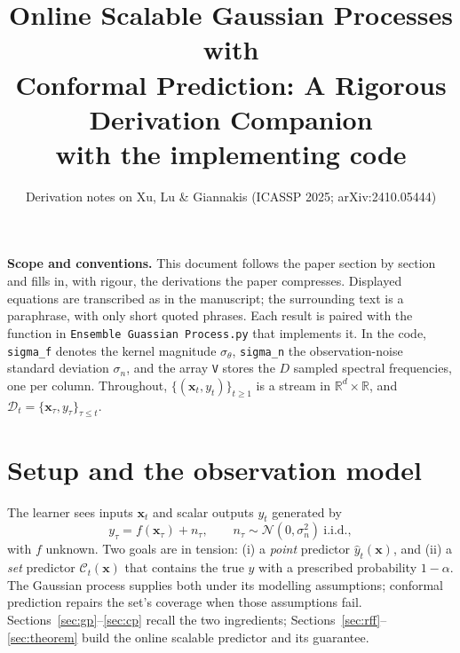 \documentclass[11pt]{article}
\title{\vspace{-1.2cm}\bfseries Online Scalable Gaussian Processes with\\Conformal Prediction: A Rigorous Derivation Companion\\[2pt]\large with the implementing code}
\author{Derivation notes on Xu, Lu \& Giannakis (ICASSP 2025; arXiv:2410.05444)}
\date{}
\theoremstyle{plain}
\theoremstyle{definition}
\newcommand{\R}{\mathbb{R}}
\newcommand{\N}{\mathcal{N}}
\newcommand{\D}{\mathcal{D}}
\newcommand{\C}{\mathcal{C}}
\newcommand{\x}{\mathbf{x}}
\newcommand{\hy}{\hat{y}}
\newcommand{\sn}{\sigma_n}
\newcommand{\code}[1]{\texttt{#1}}
\begin{document}
\maketitle
\vspace{-0.7cm}

\noindent\textbf{Scope and conventions.} This document follows the paper section by section and fills in, with rigour, the derivations the paper compresses. Displayed equations are transcribed as in the manuscript; the surrounding text is a paraphrase, with only short quoted phrases. Each result is paired with the function in \code{Ensemble Guassian Process.py} that implements it. In the code, \code{sigma\_f} denotes the kernel magnitude $\sigma_\theta$, \code{sigma\_n} the observation-noise standard deviation $\sn$, and the array \code{V} stores the $D$ sampled spectral frequencies, one per column. Throughout, $\{(\x_t,y_t)\}_{t\ge1}$ is a stream in $\R^d\times\R$, and $\D_t=\{\x_\tau,y_\tau\}_{\tau\le t}$.

\tableofcontents
\bigskip

\section{Setup and the observation model}
The learner sees inputs $\x_t$ and scalar outputs $y_t$ generated by
\begin{equation}
y_\tau = f(\x_\tau) + n_\tau,\qquad n_\tau\sim\N(0,\sn^2)\ \text{i.i.d.},
\label{eq:obs}
\end{equation}
with $f$ unknown. Two goals are in tension: (i) a \emph{point} predictor $\hy_t(\x)$, and (ii) a \emph{set} predictor $\C_t(\x)$ that contains the true $y$ with a prescribed probability $1-\alpha$. The Gaussian process supplies both under its modelling assumptions; conformal prediction repairs the set's coverage when those assumptions fail. Sections~\ref{sec:gp}--\ref{sec:cp} recall the two ingredients; Sections~\ref{sec:rff}--\ref{sec:theorem} build the online scalable predictor and its guarantee.

\end{document}
